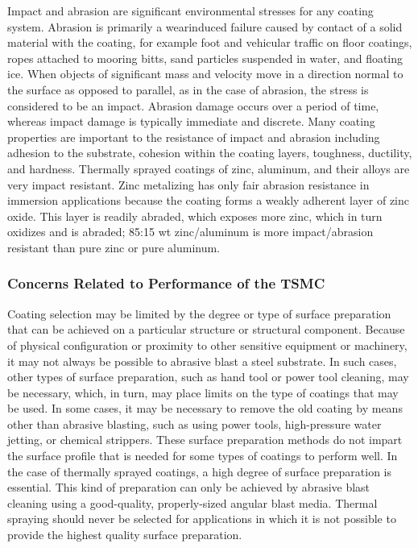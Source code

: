 Impact and abrasion are significant environmental stresses for any coating system. Abrasion is primarily a wearinduced
failure caused by contact of a solid material with the coating, for example foot and vehicular traffic on floor
coatings, ropes attached to mooring bitts, sand particles suspended in water, and floating ice. When objects of
significant mass and velocity move in a direction normal to the surface as opposed to parallel, as in the case of
abrasion, the stress is considered to be an impact. Abrasion damage occurs over a period of time, whereas impact
damage is typically immediate and discrete. Many coating properties are important to the resistance of impact and
abrasion including adhesion to the substrate, cohesion within the coating layers, toughness, ductility, and hardness.
Thermally sprayed coatings of zinc, aluminum, and their alloys are very impact resistant. Zinc metalizing has only
fair abrasion resistance in immersion applications because the coating forms a weakly adherent layer of zinc oxide.
This layer is readily abraded, which exposes more zinc, which in turn oxidizes and is abraded; 85:15 wt%
zinc/aluminum is more impact/abrasion resistant than pure zinc or pure aluminum.

\subsubsection{Concerns Related to Performance of the TSMC}
Coating selection may be limited by the degree or type of surface preparation that can be achieved on a particular
structure or structural component. Because of physical configuration or proximity to other sensitive equipment or
machinery, it may not always be possible to abrasive blast a steel substrate. In such cases, other types of surface
preparation, such as hand tool or power tool cleaning, may be necessary, which, in turn, may place limits on the type
of coatings that may be used. In some cases, it may be necessary to remove the old coating by means other than
abrasive blasting, such as using power tools, high-pressure water jetting, or chemical strippers. These surface
preparation methods do not impart the surface profile that is needed for some types of coatings to perform well. In
the case of thermally sprayed coatings, a high degree of surface preparation is essential. This kind of preparation can
only be achieved by abrasive blast cleaning using a good-quality, properly-sized angular blast media. Thermal
spraying should never be selected for applications in which it is not possible to provide the highest quality surface
preparation.

